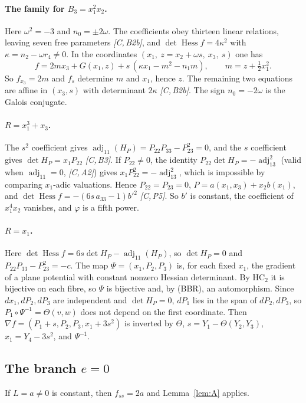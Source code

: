 \documentclass[11pt]{article}
\theoremstyle{remark}
\newcommand{\Hess}{\operatorname{Hess}}
\newcommand{\adj}{\operatorname{adj}}
\newcommand{\HC}{\mathrm{HC}}
\newcommand{\cert}[1]{\emph{[C,\,#1]}}
\begin{document}
\paragraph{The family for $B_3=x_1^2x_2$.} Here $\omega^2=-3$ and $n_0=\pm2\omega$. The coefficients obey thirteen linear relations, leaving seven free parameters \cert{B2b}, and $\det\Hess f=4\kappa^2$ with $\kappa=n_2-\omega r_4\ne0$. In the coordinates $(x_1,\ z=x_2+\omega s,\ x_3,\ s)$ one has
\[f=2mx_3+G(x_1,z)+s\,(\kappa x_1-m^2-n_1m),\qquad m=z+\tfrac12x_1^2.\]
So $f_{x_3}=2m$ and $f_s$ determine $m$ and $x_1$, hence $z$. The remaining two equations are affine in $(x_3,s)$ with determinant $2\kappa$ \cert{B2b}. The sign $n_0=-2\omega$ is the Galois conjugate.

\paragraph{$R=x_1^3+x_3$.} The $s^2$ coefficient gives $\adj_{11}(H_P)=P_{22}P_{33}-P_{23}^2=0$, and the $s$ coefficient gives $\det H_P=x_1P_{22}$ \cert{B3}. If $P_{22}\ne0$, the identity $P_{22}\det H_P=-\adj_{13}^2$ (valid when $\adj_{11}=0$, \cert{A2}) gives $x_1P_{22}^2=-\adj_{13}^2$, which is impossible by comparing $x_1$-adic valuations. Hence $P_{22}=P_{23}=0$, $P=a(x_1,x_3)+x_2b(x_1)$, and $\det\Hess f=-(6s\,a_{33}-1)b'^2$ \cert{P5}. So $b'$ is constant, the coefficient of $x_1^4x_2$ vanishes, and $\varphi$ is a fifth power.

\paragraph{$R=x_1$.} Here $\det\Hess f=6s\det H_P-\adj_{11}(H_P)$, so $\det H_P=0$ and $P_{22}P_{33}-P_{23}^2=-c$. The map $\Psi=(x_1,P_2,P_3)$ is, for each fixed $x_1$, the gradient of a plane potential with constant nonzero Hessian determinant. By $\HC_2$ it is bijective on each fibre, so $\Psi$ is bijective and, by (BBR), an automorphism. Since $dx_1,dP_2,dP_3$ are independent and $\det H_P=0$, $dP_1$ lies in the span of $dP_2,dP_3$, so $P_1\circ\Psi^{-1}=\Theta(v,w)$ does not depend on the first coordinate. Then $\nabla f=(P_1+s,P_2,P_3,x_1+3s^2)$ is inverted by $\Theta$, $s=Y_1-\Theta(Y_2,Y_3)$, $x_1=Y_4-3s^2$, and $\Psi^{-1}$.

\subsection{The branch $e=0$}
If $L=a\ne0$ is constant, then $f_{ss}=2a$ and Lemma~\ref{lem:A} applies.
\end{document}
